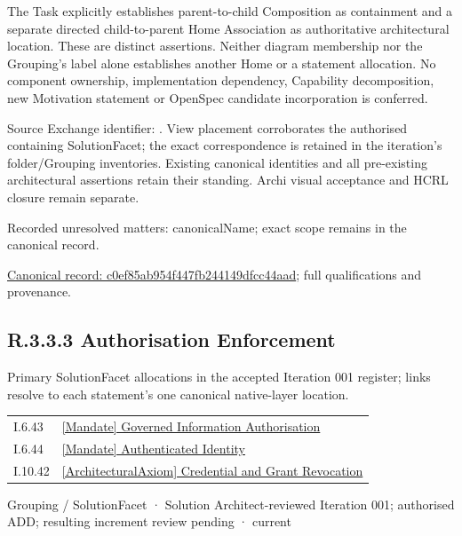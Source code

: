 The Task explicitly establishes parent-to-child Composition as containment and
a separate directed child-to-parent Home Association as authoritative architectural
location. These are distinct assertions. Neither diagram membership nor the
Grouping's label alone establishes another Home or a statement allocation.
No component ownership, implementation dependency, Capability decomposition,
new Motivation statement or OpenSpec candidate incorporation is conferred.



Source Exchange identifier: \texttt{}. View placement corroborates
the authorised containing SolutionFacet; the exact correspondence is retained in the
iteration's folder/Grouping inventories. Existing canonical identities and all
pre-existing architectural assertions retain their standing. Archi visual
acceptance and HCRL closure remain separate.


{\small Recorded unresolved matters: canonicalName; exact scope remains in the canonical record.}\par
{\footnotesize \href{../../../../../../../continuum/grouping/c0ef85ab954f447fb244149dfcc44aad.md}{Canonical record: c0ef85ab954f447fb244149dfcc44aad}; full qualifications and provenance.}\par
\subsection*{R.3.3.3 Authorisation Enforcement}
\label{navigation:R.3.3.3}

Primary SolutionFacet allocations in the accepted Iteration 001 register; links resolve to each statement’s one canonical native-layer location.\par
\begin{longtable}{p{.22\linewidth}p{.73\linewidth}}
I.6.43 & \hyperref[element:8812fcd52d3f4afcbeef41b60bda5874]{[Mandate] Governed Information Authorisation} \\
I.6.44 & \hyperref[element:72b6d13c85944e2d93efc6c5f5a53d82]{[Mandate] Authenticated Identity} \\
I.10.42 & \hyperref[element:370d9a6e0e00402aba9720580a2e365e]{[ArchitecturalAxiom] Credential and Grant Revocation} \\
\end{longtable}
\label{element:fe8916b03b084e82af587ac5a900349b}
{\small Grouping / SolutionFacet · Solution Architect-reviewed Iteration 001; authorised ADD; resulting increment review pending · current}\par

